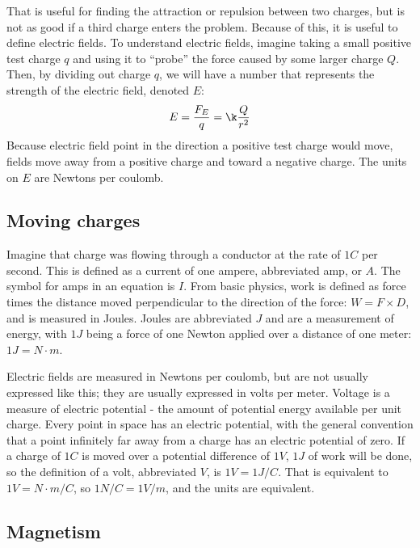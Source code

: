 \documentclass[12pt]{article}
\begin{document}
That is useful for finding the attraction or repulsion between two charges, but is not as good if a third charge enters the problem. Because of this, it is useful to define electric fields. To understand electric fields, imagine taking a small positive test charge $q$ and using it to ``probe'' the force caused by some larger charge $Q$. Then, by dividing out charge $q$, we will have a number that represents the strength of the electric field, denoted $E$:
\begin{equation}
\displaystyle E = \frac{F_E}{q} = \k \frac{Q}{r^2}
\end{equation}
Because electric field point in the direction a positive test charge would move, fields move away from a positive charge and toward a negative charge. The units on $E$ are Newtons per coulomb.

\subsection{Moving charges}

\indent Imagine that charge was flowing through a conductor at the rate of $1C$ per second. This is defined as a current of one ampere, abbreviated amp, or $A$. The symbol for amps in an equation is $I$. From basic physics, work is defined as force times the distance moved perpendicular to the direction of the force: $W=F\times D$, and is measured in Joules. Joules are abbreviated $J$ and are a measurement of energy, with $1J$ being a force of one Newton applied over a distance of one meter: $1J=N\cdot m$. 

Electric fields are measured in Newtons per coulomb, but are not usually expressed like this; they are usually expressed in volts per meter. Voltage is a measure of electric potential - the amount of potential energy available per unit charge. Every point in space has an electric potential, with the general convention that a point infinitely far away from a charge has an electric potential of zero. If a charge of $1C$ is moved over a potential difference of $1V$, $1J$ of work will be done, so the definition of a volt, abbreviated $V$, is $1V=1J/C$. That is equivalent to $1V=N\cdot m/C$, so $1N/C=1V/m$, and the units are equivalent. 

\subsection{Magnetism}
\end{document}
